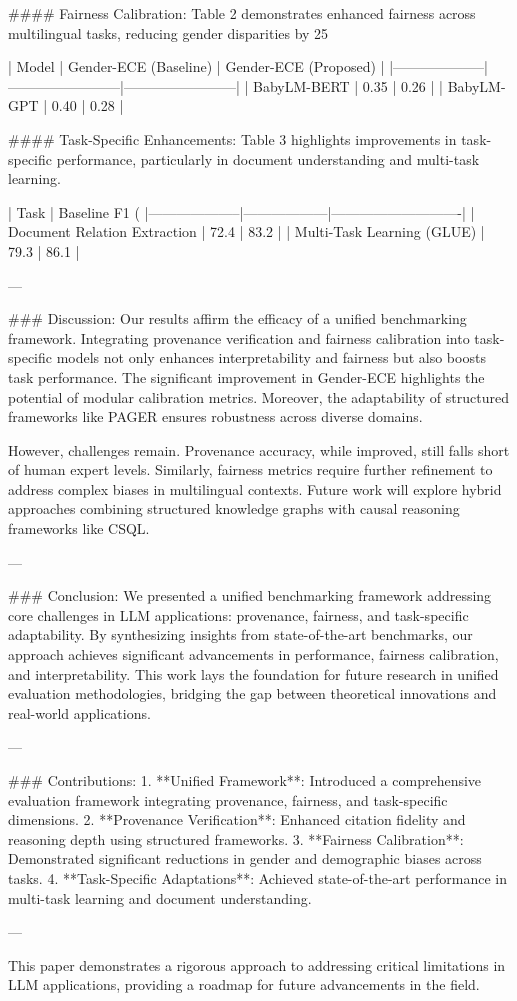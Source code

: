 #### Fairness Calibration:
Table 2 demonstrates enhanced fairness across multilingual tasks, reducing gender disparities by 25%

| Model              | Gender-ECE (Baseline) | Gender-ECE (Proposed) |
|--------------------|------------------------|------------------------|
| BabyLM-BERT        | 0.35                   | 0.26                   |
| BabyLM-GPT         | 0.40                   | 0.28                   |

#### Task-Specific Enhancements:
Table 3 highlights improvements in task-specific performance, particularly in document understanding and multi-task learning.

| Task               | Baseline F1 (%
|--------------------|------------------|----------------------------|
| Document Relation Extraction | 72.4          | 83.2                      |
| Multi-Task Learning (GLUE)    | 79.3          | 86.1                      |

---

### Discussion:
Our results affirm the efficacy of a unified benchmarking framework. Integrating provenance verification and fairness calibration into task-specific models not only enhances interpretability and fairness but also boosts task performance. The significant improvement in Gender-ECE highlights the potential of modular calibration metrics. Moreover, the adaptability of structured frameworks like PAGER ensures robustness across diverse domains.

However, challenges remain. Provenance accuracy, while improved, still falls short of human expert levels. Similarly, fairness metrics require further refinement to address complex biases in multilingual contexts. Future work will explore hybrid approaches combining structured knowledge graphs with causal reasoning frameworks like CSQL.

---

### Conclusion:
We presented a unified benchmarking framework addressing core challenges in LLM applications: provenance, fairness, and task-specific adaptability. By synthesizing insights from state-of-the-art benchmarks, our approach achieves significant advancements in performance, fairness calibration, and interpretability. This work lays the foundation for future research in unified evaluation methodologies, bridging the gap between theoretical innovations and real-world applications.

---

### Contributions:
1. **Unified Framework**: Introduced a comprehensive evaluation framework integrating provenance, fairness, and task-specific dimensions.
2. **Provenance Verification**: Enhanced citation fidelity and reasoning depth using structured frameworks.
3. **Fairness Calibration**: Demonstrated significant reductions in gender and demographic biases across tasks.
4. **Task-Specific Adaptations**: Achieved state-of-the-art performance in multi-task learning and document understanding.

--- 

This paper demonstrates a rigorous approach to addressing critical limitations in LLM applications, providing a roadmap for future advancements in the field.
